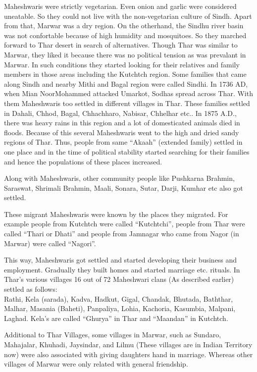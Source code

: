 Maheshwaris were strictly vegetarian. Even onion and garlic were considered uneatable. So they could not live with the non-vegetarian culture of Sindh. Apart from that, Marwar was a dry region. On the otherhand, the Sindhu river basin was not confortable because of high humidity and mosquitoes. So they marched forward to Thar desert in search of alternatives. Though Thar was similar to Marwar, they liked it because there was no political tension as was prevalant in Marwar. In such conditions they started looking for their relatives and family members in those areas including the Kutchtch region. Some families that came along Sindh and nearby Mithi and Bagal region were called Sindhi. In 1736 AD, when Mian NoorMohammed attacked Umarkot, Sodhas spread across Thar. With them Maheshwaris too settled in different villages in Thar. These families settled in Dahali, Chhod, Bagal, Chhachharo, Nabisar, Chhelhar etc.. In 1875 A.D., there was heavy rains in this region and a lot of domesticated animals died in floods. Because of this several Maheshwaris went to the high and dried sandy regions of Thar. Thus, people from same ``Akaah'' (extended family) settled in one place and in the time of political stability started searching for their families and hence the populations of these places increased.

Along with Maheshwaris, other community people like Pushkarna Brahmin, Saraswat, Shrimali Brahmin, Maali, Sonara, Sutar, Darji, Kumhar etc also got settled.

These migrant Maheshwaris were known by the places they migrated. For example people from Kutchtch were called ``Kutchtchi'', people from Thar were called ``Thari or Dhati'' and people from Jamnagar who came from Nagor (in Marwar) were called ``Nagori''.

This way, Maheshwaris got settled and started developing their business and employment. Gradually they built homes and started marriage etc. rituals. In Thar's various villages 16 out of 72 Maheshwari clans (As described earlier) settled as follows:\\
Rathi, Kela (sarada), Kadva, Hadkut, Gigal, Chandak, Bhutada, Baththar, Malhar, Masania (Baheti), Panpaliya, Lohia, Kachoria, Kasumbia, Malpani, Laghad. Kela's are called ``Ghurya'' in Thar and ``Maandan'' in Kutchtch.

Additional to Thar Villages, some villages in Marwar, such as Sundaro, Mahajalar, Khuhadi, Jaysindar, and Lilmu (These villages are in Indian Territory now) were also associated with giving daughters hand in marriage. Whereas other villages of Marwar were only related with general friendship.
